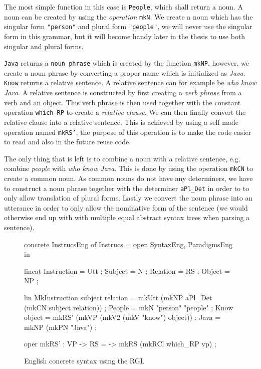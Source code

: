 The most simple function in this case is \texttt{People}, which shall return a noun. A noun can be created by using the \emph{operation} \texttt{mkN}. We create a noun which has the singular form \texttt{"person"} and plural form \texttt{"people"}, we will never use the singular form in this grammar, but it will become handy later in the thesis to use both singular and plural forms.

\texttt{Java} returns a \texttt{noun phrase} which is created by the function \texttt{mkNP}, however, we create a noun phrase by converting a proper name which is initialized as \emph{Java}. \texttt{Know} returns a relative sentence. A relative sentence can for example be \emph{who know Java}. A relative sentence is constructed by first creating a \emph{verb phrase} from a verb and an object. This verb phrase is then used together with the constant operation \texttt{which\_RP} to create a \emph{relative clause}. We can then finally convert the relative clause into a relative sentence. This is achieved by using a self made operation named \texttt{mkRS'}, the purpose of this operation is to make the code easier to read and also in the future reuse code. 

The only thing that is left is to combine a noun with a relative sentence, e.g. combine \emph{people} with \emph{who know Java}. This is done by using the operation \texttt{mkCN} to create a common noun. As common nouns do not have any determiners, we have to construct a noun phrase together with the determiner \texttt{aPl\_Det} in order to to only allow translation of plural forms. Lastly we convert the noun phrase into an utterance in order to only allow the nominative form of the sentence (we would otherwise end up with with multiple equal abstract syntax trees when parsing a sentence).

\begin{figure}[h]
\begin{code}
concrete InstrucsEng of Instrucs = open SyntaxEng, ParadigmsEng in {
  lincat
    Instruction = Utt ;
    Subject = N ;
    Relation = RS ;
    Object = NP ;

  lin
    MkInstruction subject relation = mkUtt 
                                      (mkNP aPl_Det (mkCN subject relation)) ;
    People = mkN "person" "people" ;
    Know object = mkRS' (mkVP (mkV2 (mkV "know") object)) ;
    Java = mkNP (mkPN "Java") ;
    
   oper
      mkRS' : VP -> RS = \vp -> mkRS (mkRCl which_RP vp) ;
}
\end{code}
\caption{English concrete syntax using the RGL\label{fig:english-RGL}}
\end{figure}

